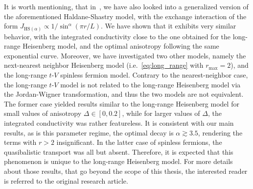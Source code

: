 It is worth mentioning, that in~\textcite{Mierzejewski2023},
we have also looked into a generalized version of the aforementioned Haldane-Shastry model,
with the exchange interaction of the form \(J_{\mathrm{HS}(\alpha)} \propto 1/\sin^{\alpha}(\pi r/L)\).
We have shown that it exhibits very similar behavior, with the integrated conductivity
close to the one obtained for the long-range Heisenberg model, and the optimal anisotropy
following the same exponential curve. Moreover, we have investigated two other
models, namely the next-nearest neighbor Heisenberg model (i.e.~\eqref{eq:long_range} with \(r_\mathrm{max} = 2\)),
and the long-range \(t\)-\(V\) spinless fermion model.
Contrary to the nearest-neighbor case, the long-range \(t\)-\(V\) model is not related to the long-range
Heisenberg model via the Jordan-Wigner transformation, and thus the two models are not equivalent.
The former case yielded results similar to the long-range Heisenberg model for small values
of anisotropy \(\Delta\in\left[0,0.2\right]\), while for larger values of \(\Delta\), the integrated conductivity
was rather featureless. It is consistent with our main results, as is this parameter regime, the optimal
decay is \(\alpha \gtrsim 3.5\), rendering the terms with \(r > 2\) insignificant.
In the latter case of spinless fermions, the quasibalistic transport was all but absent. Therefore,
it is expected that this phenomenon is unique to the long-range Heisenberg model.
For more details about those results, that go beyond the scope of this thesis, the interested reader is referred to
the original research article.
